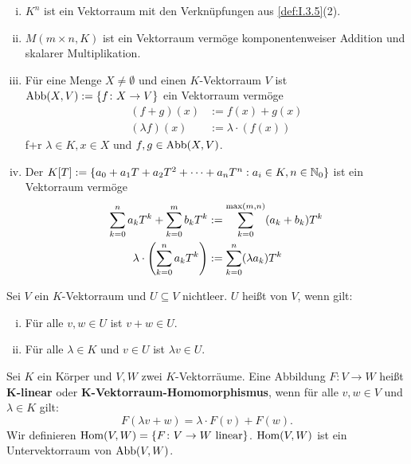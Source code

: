 \begin{beispiel}
	\label{bsp:I.5.2}
	\begin{enumerate}[(i)]
		\item $K^n$ ist ein Vektorraum mit den Verknüpfungen aus \autoref{def:I.3.5}(2).
		\item $M(m \times n,K)$ ist ein Vektorraum vermöge komponentenweiser Addition und skalarer Multiplikation.
		\item Für eine Menge $X \neq \emptyset$ und einen $K$-Vektorraum $V$ ist $\operatorname{Abb}(X,V) := \{f \colon X \rightarrow V\}$ ein Vektorraum vermöge
		\begin{align*}
			(f+g)(x) &:= f(x) + g(x) \\
			(\lambda f)(x) &:= \lambda \cdot (f(x))
		\end{align*}
		f+r $\lambda \in K, x \in X$ und $f,g \in \operatorname{Abb}(X,V)$.
		\item Der  $K[T] := \{a_0 + a_1 T + a_2 T^2 + \dots + a_n T^n : a_i \in K, n \in \mathbb{N}_0\}$ ist ein Vektorraum vermöge
		\begin{align*}
			\sum_{k=0}^{n} a_kT^k + \sum_{k=0}^{m} b_kT^k &:= \sum_{k=0}^{\max(m,n)} (a_k + b_k)T^k \\
			\lambda \cdot \left(\sum_{k=0}^{n} a_kT^k\right) &:= \sum_{k=0}^{n} (\lambda a_k)T^k
		\end{align*}
	\end{enumerate}	
\end{beispiel}
\newpage
\setcounter{satz}{3}
\begin{definition}[Untervektorraum]
	\label{def:I.5.4}
	Sei $V$ ein $K$-Vektorraum und $U \subseteq V$ nichtleer.
	$U$ heißt  von $V$, wenn gilt:
	\begin{enumerate}[(i)]
		\item Für alle $v,w \in U$ ist $v+w \in U$.
		\item Für alle $\lambda \in K$ und $v \in U$ ist $\lambda v \in U$.
	\end{enumerate}
\end{definition}

\setcounter{satz}{6}
\begin{definition}
	\label{def:I.5.7}
	Sei $K$ ein Körper und $V,W$ zwei $K$-Vektorräume.
	Eine Abbildung $F \colon V \rightarrow W$ heißt $\mathbf{K}$\textbf{-linear} oder $\mathbf{K}$\textbf{-Vektorraum-Homomorphismus}, wenn für alle $v,w \in V$ und $\lambda \in K$ gilt:
	\[
		F(\lambda v + w) = \lambda \cdot F(v) + F(w).
	\]
	Wir definieren $\operatorname{Hom}(V,W) = \{F \colon V \rightarrow W \text{ linear}\}$.
	$\operatorname{Hom}(V,W)$ ist ein Untervektorraum von $\operatorname{Abb}(V,W)$.
\end{definition}

